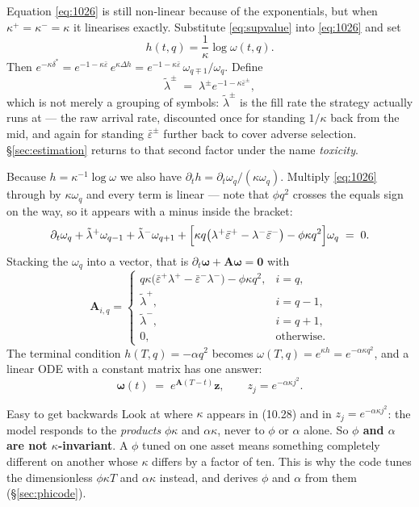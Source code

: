 \documentclass[11pt,a4paper]{article}
\newcommand{\epsb}{\bar{\varepsilon}}
\begin{document}
Equation \eqref{eq:1026} is still non-linear because of the exponentials, but
when $\kappa^{+} = \kappa^{-} = \kappa$ it linearises exactly. Substitute
\eqref{eq:supvalue} into \eqref{eq:1026} and set
\[
  h(t,q) = \frac{1}{\kappa}\log \omega(t,q).
\]
Then $e^{-\kappa\delta^{*}} = e^{-1-\kappa\epsb}\,e^{\kappa\Delta h}
= e^{-1-\kappa\epsb}\,\omega_{q\mp1}/\omega_q$. Define
\[
  \tilde{\lambda}^{\pm} \;=\; \lambda^{\pm} e^{-1-\kappa\epsb^{\pm}} ,
\]
which is not merely a grouping of symbols: $\tilde{\lambda}^{\pm}$ is the fill
rate the strategy actually runs at --- the raw arrival rate, discounted once for
standing $1/\kappa$ back from the mid, and again for standing $\epsb^{\pm}$
further back to cover adverse selection. \S\ref{sec:estimation} returns to that
second factor under the name \emph{toxicity}.

Because $h = \kappa^{-1}\log\omega$ we also have $\partial_t h =
\partial_t\omega_q / (\kappa\omega_q)$. Multiply \eqref{eq:1026} through by
$\kappa\omega_q$ and every term is linear --- note that $\phi q^2$ crosses the
equals sign on the way, so it appears with a minus inside the bracket:
\[
  \partial_t \omega_q
  + \tilde{\lambda}^{+}\omega_{q-1}
  + \tilde{\lambda}^{-}\omega_{q+1}
  + \Bigl[\kappa q\bigl(\lambda^{+}\epsb^{+} - \lambda^{-}\epsb^{-}\bigr) - \phi\kappa q^{2}\Bigr]\omega_q
  \;=\; 0 .
\]
Stacking the $\omega_q$ into a vector, that is $\partial_t\boldsymbol{\omega} +
\mathbf{A}\boldsymbol{\omega} = \mathbf{0}$ with
\begin{equation}
  \mathbf{A}_{i,q} =
  \begin{cases}
    q\kappa\bigl(\epsb^{+}\lambda^{+} - \epsb^{-}\lambda^{-}\bigr) - \phi\kappa q^{2},
      & i = q,\\[2pt]
    \tilde{\lambda}^{+}, & i = q-1,\\[2pt]
    \tilde{\lambda}^{-}, & i = q+1,\\[2pt]
    0, & \text{otherwise.}
  \end{cases}
  \tag{10.28}
  \label{eq:1028}
\end{equation}
The terminal condition $h(T,q) = -\alpha q^2$ becomes $\omega(T,q) = e^{\kappa h}
= e^{-\alpha\kappa q^{2}}$, and a linear ODE with a constant matrix has one
answer:
\begin{equation}
  \boldsymbol{\omega}(t) \;=\; e^{\mathbf{A}(T-t)}\mathbf{z},
  \qquad z_j = e^{-\alpha\kappa j^{2}} .
  \tag{10.29}
\end{equation}

\begin{trap}{Easy to get backwards}
\label{trap:kappa}
Look at where $\kappa$ appears in (10.28) and in $z_j = e^{-\alpha\kappa j^2}$:
the model responds to the \emph{products} $\phi\kappa$ and $\alpha\kappa$, never
to $\phi$ or $\alpha$ alone. So \textbf{$\phi$ and $\alpha$ are not
$\kappa$-invariant}. A $\phi$ tuned on one asset means something completely
different on another whose $\kappa$ differs by a factor of ten. This is why the
code tunes the dimensionless $\phi\kappa T$ and $\alpha\kappa$ instead, and
derives $\phi$ and $\alpha$ from them (\S\ref{sec:phicode}).
\end{trap}
\end{document}
